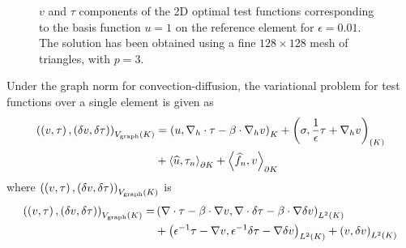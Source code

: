 \begin{figure}[!h]
\centering
{}
\caption{$v$ and $\tau$ components of the 2D optimal test functions corresponding to the basis function $u=1$ on the reference element for $\epsilon = 0.01$. The solution has been obtained using a fine $128\times128$ mesh of triangles, with $p = 3$. }
\label{fig:optTestBoundary}
\end{figure}

Under the graph norm for convection-diffusion, the variational problem for test functions over a single element is given as
\begin{align*}
\LRp{\LRp{v,\tau},\LRp{\delta v,\delta \tau}}_{V_{\rm graph}(K)} &= \LRp{u, \Grad_h\cdot \tau - \beta\cdot \Grad_h v}_{K} + \LRp{\sigma, \frac{1}{\epsilon}\tau + \Grad_h v}_{(K)} \\
&+ \LRa{\uh,\tau_n}_{\partial K} + \LRa{\fnh,v}_{\partial K}
\end{align*}
where $\LRp{\LRp{v,\tau},\LRp{\delta v,\delta \tau}}_{V_{\rm graph}(K)}$ is 
\begin{align*}
\LRp{\LRp{v,\tau},\LRp{\delta v,\delta \tau}}_{V_{\rm graph}(K)} =& \LRp{\div\tau - \beta \cdot \grad v,\div\delta \tau - \beta \cdot \grad \delta v}_{L^2(K)} \\
&+ \LRp{{\epsilon}^{-1} \tau -  \grad v,{\epsilon}^{-1} \delta \tau -  \grad \delta v}_{L^2(K)} + \LRp{v,\delta v}_{L^2(K)} 
\end{align*}

